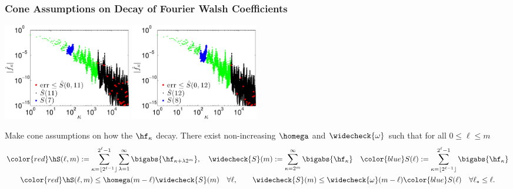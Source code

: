 \documentclass[10pt,compress]{beamer} %
\newcommand{\wcS}{\widecheck{S}}
\newcommand{\wcomega}{\widecheck{\omega}}
\begin{document}
\begin{frame}\frametitle{Cone Assumptions on Decay of Fourier Walsh Coefficients}
\begin{center}
\includegraphics[width=5.6cm]{ProgramsImages/PlotFWTCoefUse128.eps} \quad
\includegraphics[width=5.6cm]{ProgramsImages/PlotFWTCoefUse256.eps} \quad
\end{center}
\vspace{-3ex}
Make \alert{cone} assumptions on how the $\hf_{\kappa}$ decay.  There exist non-increasing $\homega$ and $\wcomega$ such that for all $0 \le \ell \le m$
\vspace{-1ex}
\begin{gather*}
{\color{red}\hS(\ell,m)}  := \sum_{\kappa=\lfloor 2^{\ell-1} \rfloor}^{2^{\ell}-1} \sum_{\lambda=1}^{\infty} \bigabs{ \hf_{\kappa+\lambda 2^{m}}}, \quad
\wcS(m) :=
\sum_{\kappa=2^{m}}^{\infty} \bigabs{\hf_{\kappa}} \quad
{\color{blue}S(\ell)} :=  \sum_{\kappa=\lfloor 2^{\ell-1} \rfloor}^{2^{\ell}-1} \bigabs{\hf_{\kappa}}\\
{\color{red}\hS(\ell,m)} \le \homega(m-\ell) \wcS(m) \quad \forall \ell, \qquad
\wcS(m) \le \wcomega(m-\ell) {\color{blue}S(\ell)} \quad \forall \ell_* \le \ell.
\end{gather*}
\end{frame}
\end{document}
